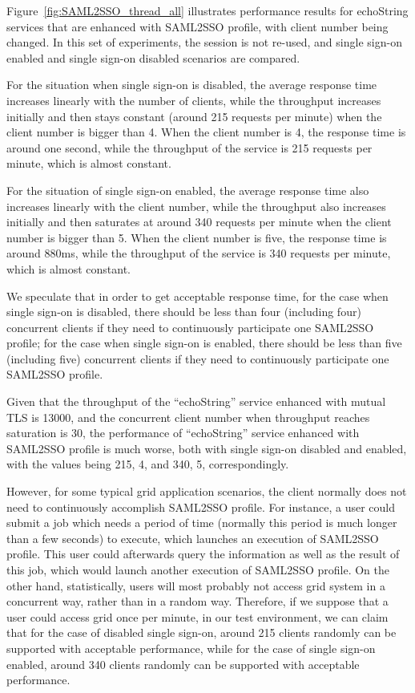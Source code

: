 \documentclass[conference]{IEEEtran}
\begin{document}
Figure~\ref{fig:SAML2SSO_thread_all} illustrates performance results for
echoString services that are enhanced with SAML2SSO profile, with client number being changed. In
this set of experiments, the session is not re-used, and single sign-on enabled and single sign-on
disabled scenarios are compared. 

For the situation when single sign-on is disabled, the average response time 
increases linearly with the number of clients, while the throughput increases initially and then 
stays constant (around 215 requests per minute) when the client number is bigger 
than 4. When the client number is 4, the response time is around one second, while the 
throughput of the service is 215 requests per minute, which is almost constant.

For the situation of single sign-on enabled, the average response time 
also increases linearly with the client number, while the throughput also increases initially and then 
saturates at around 340 requests per minute when the client number is bigger 
than 5. When the client number is five, the response time is around 880ms, while the 
throughput of the service is 340 requests per minute, which is almost constant.

We speculate that in order to get acceptable response time, for the case when single sign-on is disabled, 
there should be less than four (including four) concurrent clients if they need to continuously 
participate one SAML2SSO profile; for the case when single sign-on is enabled, 
there should be less than five (including five) concurrent clients if they need to continuously 
participate one SAML2SSO profile.

Given that the throughput of the ``echoString'' service enhanced with mutual
TLS is 13000, and the concurrent client number when throughput reaches saturation is 30, the
performance of ``echoString'' service enhanced with SAML2SSO profile is much worse, both 
with single sign-on disabled and enabled, with the values being 215, 4, and 340, 5, correspondingly.

However, for some typical grid application scenarios, the client normally does
not need to continuously accomplish SAML2SSO profile. For instance, a user could submit a
job which needs a period of time (normally this period is much longer than a few
seconds) to execute, which launches an execution of SAML2SSO profile. 
This user could afterwards query the information as well as the result of
this job, which would launch another execution of SAML2SSO profile. On the other hand,
statistically, users will most probably not access grid system in a concurrent way, rather than in a random way.
Therefore, if we suppose that a user could access grid once per minute, in our test environment, we
can claim that for the case of disabled single sign-on, around 215 clients randomly can be 
supported with acceptable performance, while for the case of single sign-on enabled, around 340 
clients randomly can be supported with acceptable performance.
\end{document}
